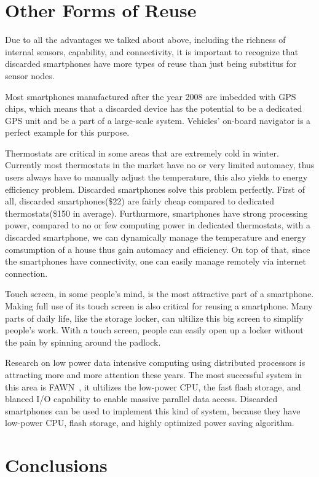\section{Other Forms of Reuse}
\label{sec-other}

Due to all the advantages we talked about above, including the richness of internal sensors, capability, and connectivity, it is important to recognize that discarded smartphones have more types of reuse than just being substitus for sensor nodes.


Most smartphones manufactured after the year 2008 are imbedded with GPS chips, which means that a discarded device has the potential to be a dedicated GPS unit and be a part of  a large-scale system. Vehicles' on-board navigator is a perfect example for this purpose. 


Thermostats are critical in some areas that are extremely cold in winter. Currently most thermostats in the market have no or very limited automacy, thus users always have to manually adjust the temperature, this also yields to energy efficiency problem.  Discarded smartphones solve this problem perfectly. First of all, discarded smartphones(\$22) are fairly cheap compared to dedicated thermostats(\$150 in average). Furthurmore, smartphones have strong processing power, compared to no or few computing power in dedicated thermostats, with a discarded smartphone, we can dynamically manage the temperature and energy comsumption of a house thus gain automacy and efficiency. On top of that, since the smartphones have connectivity, one can easily manage remotely via internet connection. 


Touch screen, in some people's mind, is the most attractive part of a smartphone. Making full use of its touch screen is also critical for reusing a smartphone. Many parts of daily life, like the storage locker, can ultilize this big screen to simplify people's work. With a touch screen, people can easily open up a locker without the pain by spinning around the padlock. 


Research on low power data intensive computing using distributed processors is attracting more and more attention these years. The most successful system in this area is FAWN~\cite{fawn}, it ultilizes the low-power CPU, the fast flash storage, and blanced I/O capability to enable massive parallel data access. Discarded smartphones can be used to implement this kind of system, because they have low-power CPU, flash storage, and highly optimized power saving algorithm. 


\section{Conclusions}
\label{sec-conclusion}
